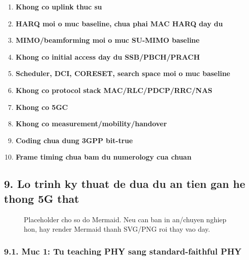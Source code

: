 \documentclass[
  vietnamese,
  a4paper,
  11pt]{article}
\providecommand{\tightlist}{%
  \setlength{\itemsep}{0pt}\setlength{\parskip}{0pt}}
\begin{document}
\begin{enumerate}
\def\labelenumi{\arabic{enumi}.}
\tightlist
\item
  \textbf{Khong co uplink thuc su}
\item
  \textbf{HARQ moi o muc baseline, chua phai MAC HARQ day du}
\item
  \textbf{MIMO/beamforming moi o muc SU-MIMO baseline}
\item
  \textbf{Khong co initial access day du SSB/PBCH/PRACH}
\item
  \textbf{Scheduler, DCI, CORESET, search space moi o muc baseline}
\item
  \textbf{Khong co protocol stack MAC/RLC/PDCP/RRC/NAS}
\item
  \textbf{Khong co 5GC}
\item
  \textbf{Khong co measurement/mobility/handover}
\item
  \textbf{Coding chua dung 3GPP bit-true}
\item
  \textbf{Frame timing chua bam du numerology cua chuan}
\end{enumerate}

\subsection{9. Lo trinh ky thuat de dua du an tien gan he thong 5G
that}\label{lo-trinh-ky-thuat-de-dua-du-an-tien-gan-he-thong-5g-that}

\begin{figure}[H]
\centering
{}
\caption{Placeholder cho so do Mermaid. Neu can ban in an/chuyen nghiep hon, hay render Mermaid thanh SVG/PNG roi thay vao day.}
\end{figure}

\subsubsection{9.1. Muc 1: Tu teaching PHY sang standard-faithful
PHY}\label{muc-1-tu-teaching-phy-sang-standard-faithful-phy}
\end{document}
